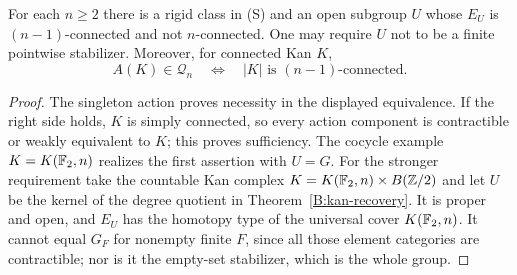 \begin{corollary}
\label{B:connectivity-gaps}
For each $n\geq2$ there is a rigid class in (S) and an open
subgroup $U$ whose $E_U$ is $(n-1)$-connected and not
$n$-connected. One may require $U$ not to be a finite
pointwise stabilizer. Moreover, for connected Kan $K$,
\[
 A(K)\in\mathcal Q_n\quad\Longleftrightarrow\quad
 |K|\text{ is }(n-1)\text{-connected}.
\]
\end{corollary}
\begin{proof}
The singleton action proves necessity in the displayed
equivalence. If the right side holds, $K$ is simply connected,
so every action component is contractible or weakly equivalent
to $K$; this proves sufficiency. The cocycle example
$K=K(\mathbb F_2,n)$ realizes the first assertion with $U=G$.
For the stronger requirement take the countable Kan complex
$K=K(\mathbb F_2,n)\times B(\mathbb Z/2)$ and let $U$ be the kernel
of the degree quotient in Theorem~\ref{B:kan-recovery}.
It is proper and open, and $E_U$ has the homotopy type of
the universal cover $K(\mathbb F_2,n)$. It cannot equal $G_F$
for nonempty finite $F$, since all those element categories
are contractible; nor is it the empty-set stabilizer, which
is the whole group.
\end{proof}
